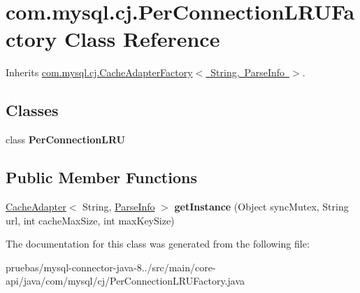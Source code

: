 \hypertarget{classcom_1_1mysql_1_1cj_1_1_per_connection_l_r_u_factory}{}\section{com.\+mysql.\+cj.\+Per\+Connection\+L\+R\+U\+Factory Class Reference}
\label{classcom_1_1mysql_1_1cj_1_1_per_connection_l_r_u_factory}


Inherits \mbox{\hyperlink{interfacecom_1_1mysql_1_1cj_1_1_cache_adapter_factory}{com.\+mysql.\+cj.\+Cache\+Adapter\+Factory$<$ String, Parse\+Info $>$}}.

\subsection*{Classes}
\begin{DoxyCompactItemize}
\item 
class {\bfseries Per\+Connection\+L\+RU}
\end{DoxyCompactItemize}
\subsection*{Public Member Functions}
\begin{DoxyCompactItemize}
\item 
\mbox{\label{classcom_1_1mysql_1_1cj_1_1_per_connection_l_r_u_factory_a772e4adb2503e41a7d469b4a0ac37981}} 
\mbox{\hyperlink{interfacecom_1_1mysql_1_1cj_1_1_cache_adapter}{Cache\+Adapter}}$<$ String, \mbox{\hyperlink{classcom_1_1mysql_1_1cj_1_1_parse_info}{Parse\+Info}} $>$ {\bfseries get\+Instance} (Object sync\+Mutex, String url, int cache\+Max\+Size, int max\+Key\+Size)
\end{DoxyCompactItemize}


The documentation for this class was generated from the following file\+:\begin{DoxyCompactItemize}
\item 
pruebas/mysql-\/connector-\/java-\/8../src/main/core-\/api/java/com/mysql/cj/Per\+Connection\+L\+R\+U\+Factory.\+java\end{DoxyCompactItemize}
